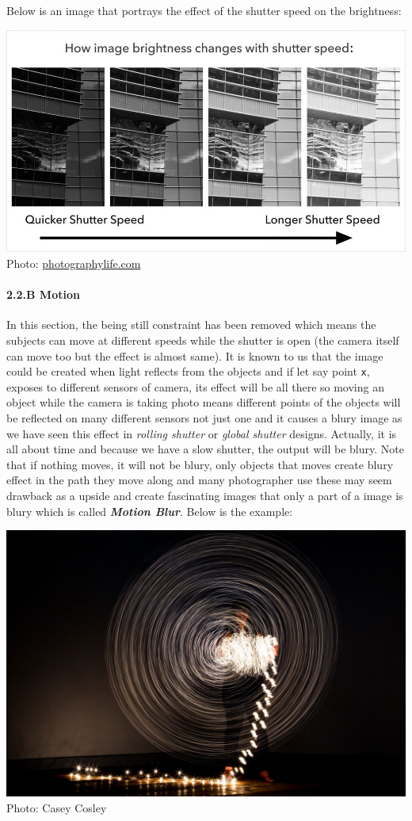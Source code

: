 \documentclass[11pt]{article}
\makeatletter
\def\maxwidth{\ifdim\Gin@nat@width>\linewidth\linewidth
    \else\Gin@nat@width\fi}
\let\Oldincludegraphics\includegraphics
\renewcommand{\includegraphics}[1]{\Oldincludegraphics[width=.8\maxwidth]{#1}}
\makeatother
\begin{document}
Below is an image that portrays the effect of the shutter speed on the
brightness:

\includegraphics{wiki/exposure1.jpg} Photo:
\href{https://photographylife.com}{photographylife.com}

\hypertarget{b-motion}{%
\paragraph{2.2.B Motion}\label{b-motion}}

In this section, the being still constraint has been removed which means
the subjects can move at different speeds while the shutter is open (the
camera itself can move too but the effect is almost same). It is known
to us that the image could be created when light reflects from the
objects and if let say point \texttt{x}, exposes to different sensors of
camera, its effect will be all there so moving an object while the
camera is taking photo means different points of the objects will be
reflected on many different sensors not just one and it causes a blury
image as we have seen this effect in \emph{rolling shutter} or
\emph{global shutter} designs. Actually, it is all about time and
because we have a slow shutter, the output will be blury. Note that if
nothing moves, it will not be blury, only objects that moves create
blury effect in the path they move along and many photographer use these
may seem drawback as a upside and create fascinating images that only a
part of a image is blury which is called \emph{\textbf{Motion Blur}}.
Below is the example:

\includegraphics{wiki/motionblur1.jpg} Photo: Casey Cosley
\end{document}
